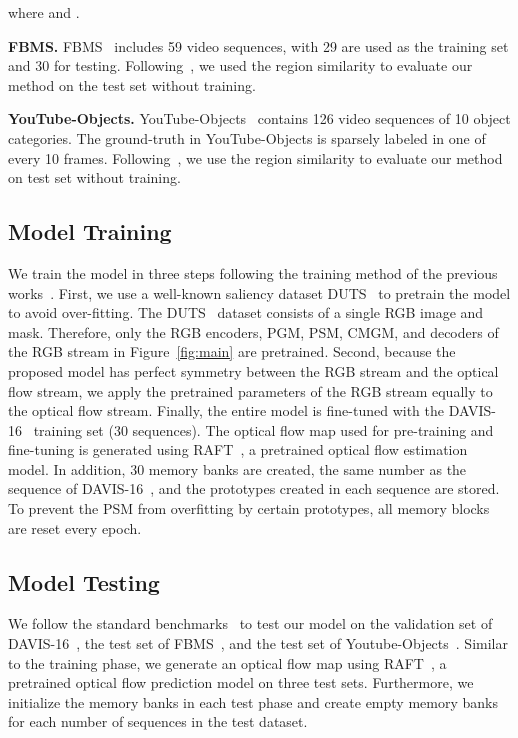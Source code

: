 \documentclass[10pt,twocolumn,letterpaper]{article}
\begin{document}
\noindent
where  and .

\noindent
\textbf{FBMS.} FBMS~\cite{ochs2013segmentation} includes 59 video sequences, with 29 are used as the training set and 30 for testing. Following~\cite{yang2019anchor, lu2019see, zhou2020motion}, we used the region similarity  to evaluate our method on the test set without training.

\noindent
\textbf{YouTube-Objects.} YouTube-Objects~\cite{prest2012learning} contains 126 video sequences of 10 object categories. The ground-truth in YouTube-Objects is sparsely labeled in one of every 10 frames. Following~\cite{yang2019anchor, lu2019see, zhou2020motion}, we use the region similarity  to evaluate our method on test set without training.

\subsection{Model Training}
We train the model in three steps following the training method of the previous works~\cite{ji2021full, ren2021reciprocal, liu2021f2net, lu2019see}. First, we use a well-known saliency dataset DUTS~\cite{wang2017learning} to pretrain the model to avoid over-fitting. The DUTS~\cite{wang2017learning} dataset consists of a single RGB image and mask. Therefore, only the RGB encoders, PGM, PSM, CMGM, and decoders of the RGB stream in Figure~\ref{fig:main} are pretrained. Second, because the proposed model has perfect symmetry between the RGB stream and the optical flow stream, we apply the pretrained parameters of the RGB stream equally to the optical flow stream. Finally, the entire model is fine-tuned with the DAVIS-16~\cite{perazzi2016benchmark} training set (30 sequences). The optical flow map used for pre-training and fine-tuning is generated using RAFT~\cite{teed2020raft}, a pretrained optical flow estimation model. In addition, 30 memory banks are created, the same number as the sequence of DAVIS-16~\cite{perazzi2016benchmark}, and the prototypes created in each sequence are stored. To prevent the PSM from overfitting by certain prototypes, all memory blocks are reset every epoch.

\subsection{Model Testing}
We follow the standard benchmarks~\cite{fan2019shifting, perazzi2016benchmark} to test our model on the validation set of DAVIS-16~\cite{perazzi2016benchmark}, the test set of FBMS~\cite{ochs2013segmentation}, and the test set of Youtube-Objects~\cite{prest2012learning}. Similar to the training phase, we generate an optical flow map using RAFT~\cite{teed2020raft}, a pretrained optical flow prediction model on three test sets. Furthermore, we initialize the memory banks in each test phase and create empty memory banks for each number of sequences in the test dataset.
\end{document}
